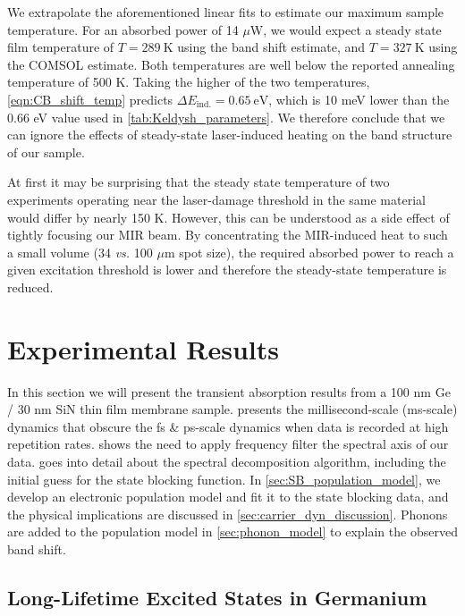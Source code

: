 We extrapolate the aforementioned linear fits to estimate our maximum sample temperature. For an absorbed power of 14 $\mu$W, we would expect a steady state film temperature of $T = 289 \ \textrm{K}$ using the band shift estimate, and $T = 327 \ \textrm{K}$ using the COMSOL estimate. Both temperatures are well below the reported annealing temperature of 500 K. Taking the higher of the two temperatures, \cref{eqn:CB_shift_temp} predicts $\Delta E_{\textrm{ind.}} = 0.65 \ \textrm{eV}$, which is 10 meV lower than the 0.66 eV value used in \cref{tab:Keldysh_parameters}. We therefore conclude that we can ignore the effects of steady-state laser-induced heating on the band structure of our sample.

At first it may be surprising that the steady state temperature of two experiments operating near the laser-damage threshold in the same material would differ by nearly 150 K. However, this can be understood as a side effect of tightly focusing our MIR beam. By concentrating the MIR-induced heat to such a small volume (34 \textit{vs.} 100 $\mu$m spot size), the required absorbed power to reach a given excitation threshold is lower and therefore the steady-state temperature is reduced. 

\section{Experimental Results}
\label{sec:experimental_results}

In this section we will present the transient absorption results from a 100 nm Ge / 30 nm SiN thin film membrane sample.  presents the millisecond-scale (ms-scale) dynamics that obscure the fs \& ps-scale dynamics when data is recorded at high repetition rates.  shows the need to apply frequency filter the spectral axis of our data.  goes into detail about the spectral decomposition algorithm, including the initial guess for the state blocking function. In \cref{sec:SB_population_model}, we develop an electronic population model and fit it to the state blocking data, and the physical implications are discussed in \cref{sec:carrier_dyn_discussion}. Phonons are added to the population model in \cref{sec:phonon_model} to explain the observed band shift.

\subsection{Long-Lifetime Excited States in Germanium}
\label{sec:ms_dynamics}

